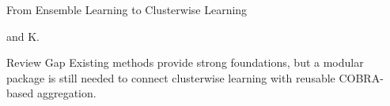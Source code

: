\begin{frame}[t]{From Ensemble Learning to Clusterwise Learning}
\begin{table}
\begin{tabularx}{\textwidth}
            and K.                                                                                                                                           \\
            \bottomrule
        \end{tabularx}
    \end{table}
    \vspace{-0.12cm}
    \begin{block}{Review Gap}
        Existing methods provide strong foundations, but a modular package is still needed to connect
        clusterwise learning with reusable COBRA-based aggregation.
    \end{block}
\end{frame}
